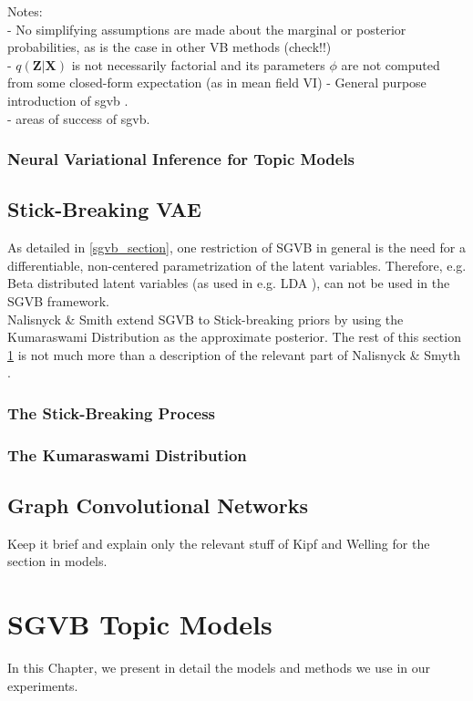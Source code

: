 \documentclass{report}
\begin{document}
Notes:\\
- No simplifying assumptions are made about the marginal or posterior probabilities, as is the case in other VB methods (check!!) \\
- $q(\mathbf{Z}|\mathbf{X})$ is not necessarily factorial and its parameters $\phi$ are not computed from some closed-form expectation (as in mean field VI)
- General purpose introduction of sgvb . \\

- areas of success of sgvb.
\subsection{Neural Variational Inference for Topic Models}

\section{Stick-Breaking VAE}\label{sbvae_section}
	As detailed in \ref{sgvb_section}, one restriction of SGVB in general is the need for a differentiable, non-centered parametrization of the latent variables. Therefore, e.g. Beta distributed latent variables (as used in e.g. LDA \cite{bleil2003latent}), can not be used in the SGVB framework. \\ Nalisnyck \& Smith extend SGVB to Stick-breaking priors by using the Kumaraswami Distribution as the approximate posterior. The rest of this section \ref{sbvae_section} is not much more than a description of the relevant part of Nalisnyck \& Smyth \cite{nalisnick2016deep}.
	
	
	\subsection{The Stick-Breaking Process}\label{sb_process}
	
	\subsection{The Kumaraswami Distribution}\label{kum}
	

\section{Graph Convolutional Networks}\label{GCN_section}
Keep it brief and explain only the relevant stuff of Kipf and Welling for the section in models. 
\chapter{SGVB Topic Models}
In this Chapter, we present in detail the models and methods we use in our experiments. 
\end{document}
